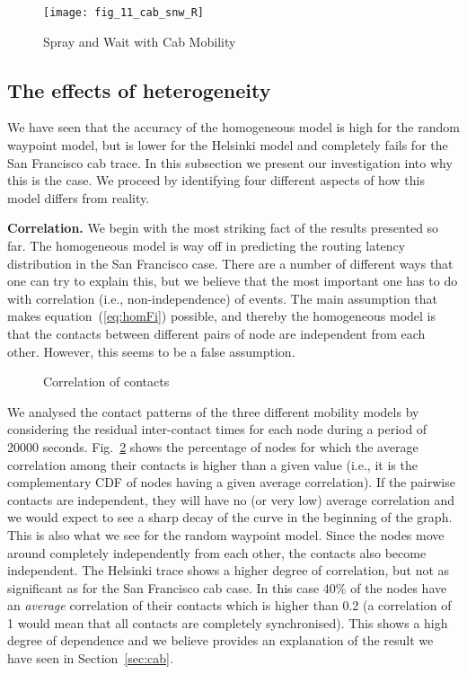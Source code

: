 \documentclass{article}
\begin{document}
\begin{figure}[ht]
  \centering
  \texttt{[image: fig\_11\_cab\_snw\_R]}
  \caption{Spray and Wait with Cab Mobility}
  \label{fig:cab_snw}
\end{figure}



\subsection{The effects of heterogeneity}
\label{sec:effects}

We have seen that the accuracy of the homogeneous model is high for
the random waypoint model, but is lower for the Helsinki model and
completely fails for the San Francisco cab trace. In this subsection
we present our investigation into why this is the case. We proceed by
identifying four different aspects of how this model differs from
reality.

{\bf Correlation.} We begin with the most striking fact of the
results presented so far. The homogeneous model is way off in
predicting the routing latency distribution in the San Francisco
case. There are a number of different ways that one can try to explain
this, but we believe that the most important one has to do with
correlation (i.e., non-independence) of events. The main assumption
that makes equation~(\ref{eq:homFi}) possible, and thereby the
homogeneous model is that the contacts between different pairs of node
are independent from each other. However, this seems to be a false
assumption.


\begin{figure}[tb]
  \centering
   \caption{Correlation of contacts}
  \label{fig:corr}
\end{figure}


We analysed the contact patterns of the three different mobility
models by considering the residual inter-contact times for each node
during a period of 20000 seconds.  Fig.~\ref{fig:corr} shows the
percentage of nodes for which the average correlation among their
contacts is higher than a given value (i.e., it is the complementary
CDF of nodes having a given average correlation). If the pairwise
contacts are independent, they will have no (or very low) average
correlation and we would expect to see a sharp decay of the curve in
the beginning of the graph. This is also what we see for the random
waypoint model. Since the nodes move around completely independently
from each other, the contacts also become independent. The Helsinki
trace shows a higher degree of correlation, but not as significant as
for the San Francisco cab case. In this case 40\% of the nodes have an
\emph{average} correlation of their contacts which is higher than 0.2
(a correlation of 1 would mean that all contacts are completely
synchronised). This shows a high degree of dependence and we believe
provides an explanation of the result we have seen in
Section~\ref{sec:cab}.
\end{document}
